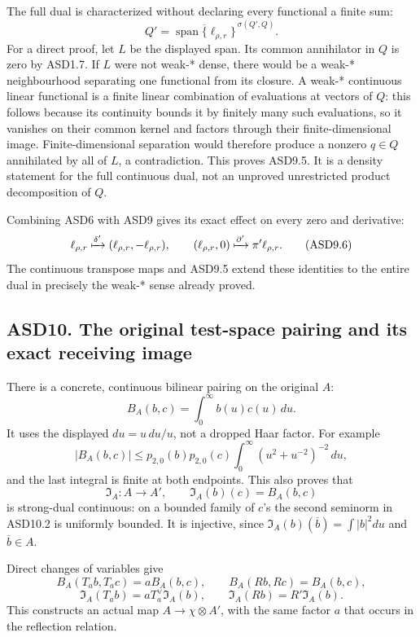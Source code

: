 The full dual is characterized without declaring every functional a
finite sum: \[
 \boxed{
 Q'=\overline{\operatorname{span}\{\ell_{\rho,r}\}}^{\,\sigma(Q',Q)}.
 }
 \tag{ASD9.5}
\] For a direct proof, let \(L\) be the displayed span. Its common
annihilator in \(Q\) is zero by ASD1.7. If \(L\) were not weak-* dense,
there would be a weak-* neighbourhood separating one functional from its
closure. A weak-* continuous linear functional is a finite linear
combination of evaluations at vectors of \(Q\): this follows because its
continuity bounds it by finitely many such evaluations, so it vanishes
on their common kernel and factors through their finite-dimensional
image. Finite-dimensional separation would therefore produce a nonzero
\(q\in Q\) annihilated by all of \(L\), a contradiction. This proves
ASD9.5. It is a density statement for the full continuous dual, not an
unproved unrestricted product decomposition of \(Q\).

Combining ASD6 with ASD9 gives its exact effect on every zero and
derivative: \[
 \ell_{\rho,r}\xmapsto{\delta'}
       (\ell_{\rho,r},-\ell_{\rho,r}),\qquad
 (\ell_{\rho,r},0)\xmapsto{\partial'}
       \pi'\ell_{\rho,r}.
 \tag{ASD9.6}
\] The continuous transpose maps and ASD9.5 extend these identities to
the entire dual in precisely the weak-* sense already proved.

\subsection{ASD10. The original test-space pairing and its exact
receiving
image}\label{asd10.-the-original-test-space-pairing-and-its-exact-receiving-image}

There is a concrete, continuous bilinear pairing on the original \(A\):
\[
 B_A(b,c)=\int_0^\infty b(u)c(u)\,du.
 \tag{ASD10.1}
\] It uses the displayed \(du=u\,du/u\), not a dropped Haar factor. For
example \[
 |B_A(b,c)|\le
 p_{2,0}(b)p_{2,0}(c)
 \int_0^\infty(u^2+u^{-2})^{-2}\,du,
 \tag{ASD10.2}
\] and the last integral is finite at both endpoints. This also proves
that \[
 \mathfrak I_A:A\to A',\qquad \mathfrak I_A(b)(c)=B_A(b,c)
 \tag{ASD10.3}
\] is strong-dual continuous: on a bounded family of \(c\)'s the second
seminorm in ASD10.2 is uniformly bounded. It is injective, since
\(\mathfrak I_A(b)(\overline b)=\int|b|^2du\) and \(\overline b\in A\).

Direct changes of variables give \[
 B_A(T_ab,T_ac)=aB_A(b,c),\qquad
 B_A(Rb,Rc)=B_A(b,c),
\] \[
 \mathfrak I_A(T_ab)=aT_a^\vee \mathfrak I_A(b),\qquad
 \mathfrak I_A(Rb)=R'\mathfrak I_A(b).
 \tag{ASD10.4}
\] This constructs an actual map \(A\to\chi\otimes A'\), with the same
factor \(a\) that occurs in the reflection relation.

